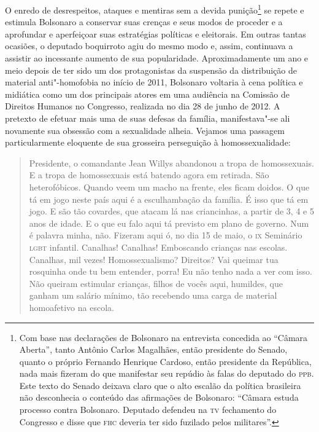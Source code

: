 O enredo de desrespeitos, ataques e mentiras sem a devida
punição\footnote{Com base nas declarações de Bolsonaro na entrevista
  concedida ao ``Câmara Aberta'', tanto Antônio Carlos Magalhães, então
  presidente do Senado, quanto o próprio Fernando Henrique Cardoso,
  então presidente da República, nada mais fizeram do que manifestar seu
  repúdio às falas do deputado do \textsc{ppb}. Este texto do Senado deixava
  claro que o alto escalão da política brasileira não desconhecia o
  conteúdo das afirmações de Bolsonaro: ``Câmara estuda processo contra
  Bolsonaro. Deputado defendeu na \textsc{tv} fechamento do Congresso e disse que
  \textsc{fhc} deveria ter sido fuzilado pelos militares''.}
se repete e estimula Bolsonaro a conservar suas crenças e seus modos de
proceder e a aprofundar e aperfeiçoar suas estratégias políticas e
eleitorais. Em outras tantas ocasiões, o deputado boquirroto agiu do
mesmo modo e, assim, continuava a assistir ao incessante aumento de sua
popularidade. Aproximadamente um ano e meio depois de ter sido um dos
protagonistas da suspensão da distribuição de material anti"-homofobia no
início de 2011, Bolsonaro voltaria à cena política e midiática como um
dos principais atores em uma audiência na Comissão de Direitos Humanos
no Congresso, realizada no dia 28 de junho de 2012. A pretexto de
efetuar mais uma de suas defesas da família, manifestava"-se ali
novamente sua obsessão com a sexualidade alheia. Vejamos uma passagem
particularmente eloquente de sua grosseira perseguição à
homossexualidade:

\begin{quote}
Presidente, o comandante Jean Willys abandonou a tropa de homossexuais.
E a tropa de homossexuais está batendo agora em retirada. São
heterofóbicos. Quando veem um macho na frente, eles ficam doidos. O que
tá em jogo neste país aqui é a esculhambação da família. É isso que tá
em jogo. E são tão covardes, que atacam lá nas criancinhas, a partir de
3, 4 e 5 anos de idade. E o que eu falo aqui tá previsto em plano de
governo. Num é palavra minha, não. Fizeram aqui ó, no dia 15 de maio, o
\textsc{ix} Seminário \textsc{lgbt} infantil. Canalhas! Canalhas! Emboscando crianças nas
escolas. Canalhas, mil vezes! Homossexualismo? Direitos? Vai queimar tua
rosquinha onde tu bem entender, porra! Eu não tenho nada a ver com isso.
Não queiram estimular crianças, filhos de vocês aqui, humildes, que
ganham um salário mínimo, tão recebendo uma carga de material
homoafetivo na escola.
\end{quote}

